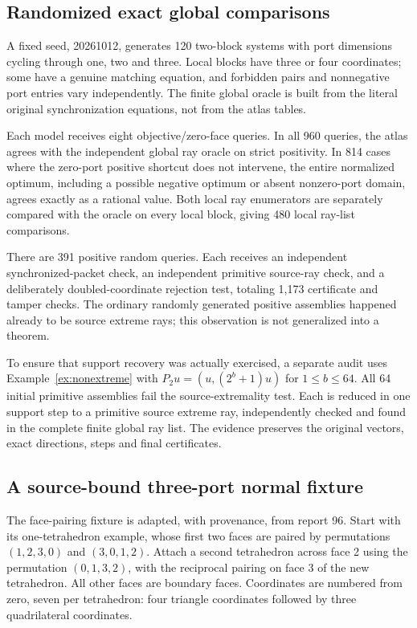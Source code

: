 \documentclass[11pt,a4paper]{article}
\theoremstyle{definition}
\theoremstyle{remark}
\begin{document}
\subsection{Randomized exact global comparisons}
A fixed seed, 20261012, generates 120 two-block systems with port dimensions cycling through one, two and three. Local blocks have three or four coordinates; some have a genuine matching equation, and forbidden pairs and nonnegative port entries vary independently. The finite global oracle is built from the literal original synchronization equations, not from the atlas tables.

Each model receives eight objective/zero-face queries. In all 960 queries, the atlas agrees with the independent global ray oracle on strict positivity. In 814 cases where the zero-port positive shortcut does not intervene, the entire normalized optimum, including a possible negative optimum or absent nonzero-port domain, agrees exactly as a rational value. Both local ray enumerators are separately compared with the oracle on every local block, giving 480 local ray-list comparisons.

There are 391 positive random queries. Each receives an independent synchronized-packet check, an independent primitive source-ray check, and a deliberately doubled-coordinate rejection test, totaling 1,173 certificate and tamper checks. The ordinary randomly generated positive assemblies happened already to be source extreme rays; this observation is not generalized into a theorem.

To ensure that support recovery was actually exercised, a separate audit uses Example~\ref{ex:nonextreme} with $P_2u=(u,(2^b+1)u)$ for $1\le b\le64$. All 64 initial primitive assemblies fail the source-extremality test. Each is reduced in one support step to a primitive source extreme ray, independently checked and found in the complete finite global ray list. The evidence preserves the original vectors, exact directions, steps and final certificates.

\subsection{A source-bound three-port normal fixture}
The face-pairing fixture is adapted, with provenance, from report 96. Start with its one-tetrahedron example, whose first two faces are paired by permutations $(1,2,3,0)$ and $(3,0,1,2)$. Attach a second tetrahedron across face 2 using the permutation $(0,1,3,2)$, with the reciprocal pairing on face 3 of the new tetrahedron. All other faces are boundary faces. Coordinates are numbered from zero, seven per tetrahedron: four triangle coordinates followed by three quadrilateral coordinates.
\end{document}
